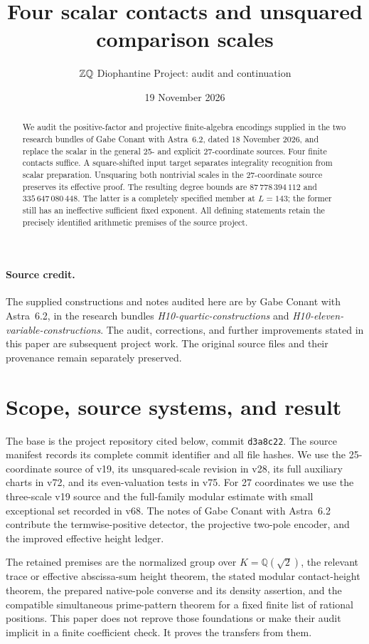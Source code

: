 \documentclass[11pt]{article}
\title{Four scalar contacts and unsquared comparison scales}
\author{\(\Z\Q\) Diophantine Project: audit and continuation}
\date{19 November 2026}
\newcommand{\Q}{\mathbb Q}\newcommand{\Z}{\mathbb Z}
\begin{document}
\maketitle
\begin{abstract}
We audit the positive-factor and projective finite-algebra encodings supplied
in the two research bundles of Gabe Conant with Astra~6.2, dated 18 November 2026, and replace the scalar in
the general 25- and explicit 27-coordinate sources. Four finite contacts
suffice. A square-shifted input target separates integrality recognition
from scalar preparation. Unsquaring both nontrivial scales in the
27-coordinate source preserves its effective proof. The resulting degree
bounds are $87\,778\,394\,112$ and $335\,647\,080\,448$.
The latter is a completely specified member at $L=143$; the former still
has an ineffective sufficient fixed exponent. All defining statements
retain the precisely identified arithmetic premises of the source project.
\end{abstract}

\paragraph{Source credit.}
The supplied constructions and notes audited here are by Gabe Conant with
Astra~6.2, in the research bundles
\emph{H10-quartic-constructions} and
\emph{H10-eleven-variable-constructions}.
The audit, corrections, and further improvements stated in this paper are
subsequent project work. The original source files and their provenance
remain separately preserved.

\section{Scope, source systems, and result}

The base is the project repository cited below, commit \texttt{d3a8c22}.
The source manifest records its complete commit identifier and all file hashes.
We use the 25-coordinate source of v19, its unsquared-scale revision in
v28, its full auxiliary charts in v72, and its even-valuation tests in v75.
For 27 coordinates we use the three-scale v19 source and the full-family
modular estimate with small exceptional set recorded in v68. The notes of Gabe Conant with Astra~6.2
contribute the termwise-positive detector, the projective
two-pole encoder, and the improved effective height ledger.

The retained premises are the normalized group over $K=\Q(\sqrt2)$,
the relevant trace or effective abscissa-sum height theorem, the stated
modular contact-height theorem, the prepared native-pole converse and
its density assertion, and the compatible simultaneous prime-pattern
theorem for a fixed finite list of rational positions. This paper does
not reprove those foundations or make their audit implicit in a finite
coefficient check. It proves the transfers from them.
\end{document}
